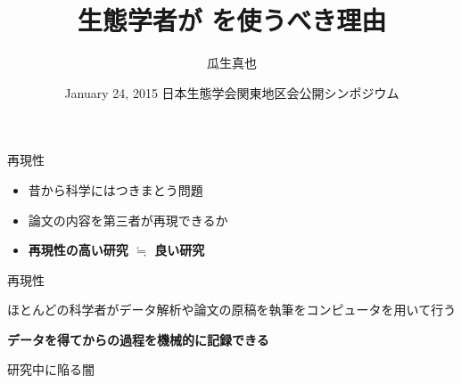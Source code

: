 \documentclass[ignorenonframetext,]{beamer}
\institute{\faUniv 横浜国立大学大学院　環境情報学府　酒井研究室}
\title{生態学者が \textcolor{Orange1}{\faGit} を使うべき理由}
\author{瓜生真也}
\date{January 24, 2015 \newline 日本生態学会関東地区会公開シンポジウム}
\begin{document}
\frame{\titlepage}

\begin{frame}


\end{frame}

\begin{frame}


\end{frame}

\begin{frame}{\faBeaker 再現性}

\begin{itemize}
\itemsep1pt\parskip0pt
\item
  昔から科学にはつきまとう問題
\item
  論文の内容を第三者が再現できるか
\item
  \textbf{再現性の高い研究 $\fallingdotseq$ 良い研究}
\end{itemize}

\end{frame}

\begin{frame}{\faBeaker 再現性}

ほとんどの科学者がデータ解析や論文の原稿を執筆をコンピュータを用いて行う

\textbf{\faHandLeft データを得てからの過程を機械的に記録できる}

\end{frame}

\begin{frame}


\end{frame}

\begin{frame}{\faWarningSign 研究中に陥る闇}


\end{frame}
\end{document}
